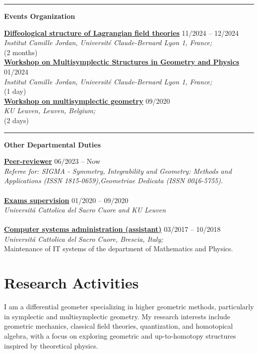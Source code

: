 \documentclass[a4paper]{article}
\newcommand{\block}[1]{\hrule \vspace{0.2cm} \textbf{\Large #1} \vspace{0.2cm}}
\newcommand{\voice}[5]{\href{#4}{\textbf{#1}} \hfill #2 \\ \textit{#3} \\ {\small #5} \vspace{0.2cm} \\}
\newcommand{\txt}[1]{#1\\}
\begin{document}
	\block{Events Organization}

	\voice{Diffeological structure of Lagrangian field theories}
		{11/2024 -- 12/2024}
		{Institut Camille Jordan, Université Claude-Bernard Lyon 1, France;}
		{https://www.antoniomiti.it/teaching/LFT-2024/}       
		{(2 months)}
	\voice{Workshop on Multisymplectic Structures in Geometry and Physics}
		{01/2024}
		{Institut Camille Jordan, Université Claude-Bernard Lyon 1, France;}
		{https://math.gmu.edu/~cblacke/lyon.html}       
		{(1 day)}
	\voice{Workshop on multisymplectic geometry}
		{09/2020}
		{KU Leuven, Leuven, Belgium;}
		{https://wis.kuleuven.be/events/multisymplectic}       
		{(2 days)}

	\block{Other Departmental Duties}

	\voice{Peer-reviewer}
		{06/2023 -- Now}
		{Referee for: SIGMA - Symmetry, Integrability and Geometry: Methods and Applications (ISSN 1815-0659),Geometriae Dedicata (ISSN 0046-5755).}
		{}
        {\vspace{-0.5cm}}
	\voice{Exams supervision}
		{01/2020 -- 09/2020}
		{Universit\'a Cattolica del Sacro Cuore and KU Leuven}
		{}       
		{\vspace{-0.5cm}}
	\voice{Computer systems administration (assistant)}
		{03/2017 -- 10/2018}
		{Universit\'a Cattolica del Sacro Cuore, Brescia, Italy;}
		{https://dipartimenti.unicatt.it/dmf-home}       
		{Maintenance of IT systems of the department of Mathematics and Physics.}

	\clearpage
	\section*{Research Activities}

	\txt{I am a differential geometer specializing in higher geometric methods, particularly in symplectic and multisymplectic geometry. My research interests include geometric mechanics, classical field theories, quantization, and homotopical algebra, with a focus on exploring geometric and up-to-homotopy structures inspired by theoretical physics. }
	
\end{document}
